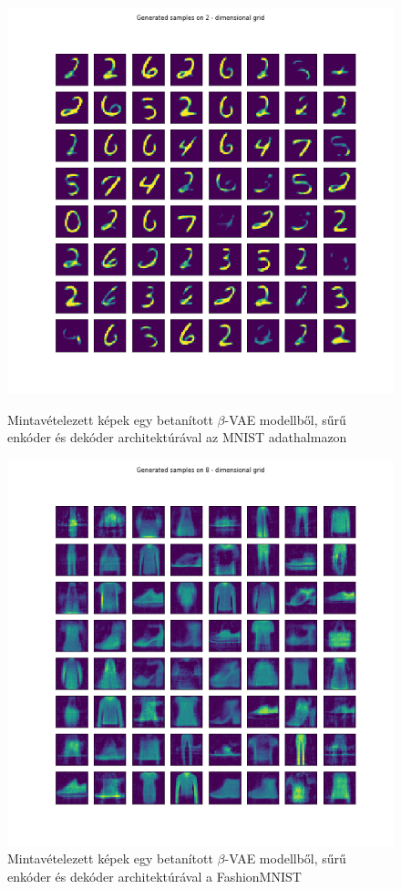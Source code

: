\documentclass[12pt, english]{article}
\begin{document}
\begin{figure}[ht] 
  \begin{minipage}{0.48\linewidth}
    \centering
    \includegraphics[width=.65\linewidth]{gen/generated_samples_mnist_dense_vae.png}
    \caption{Mintavételezett képek egy betanított $\beta$-VAE modellből, sűrű enkóder és dekóder architektúrával az MNIST adathalmazon}
    \label{fig:sampled-images-1}
  \end{minipage}\hfill
  \begin{minipage}{0.48\linewidth}
    \centering
    \includegraphics[width=.65\linewidth]{gen/generated_samples_fashion_mnist_dense_vae.png} 
    \caption{Mintavételezett képek egy betanított $\beta$-VAE modellből, sűrű enkóder és dekóder architektúrával a FashionMNIST} 
    \label{fig:sampled-images-2}
  \end{minipage} 
\end{figure}
\end{document}
